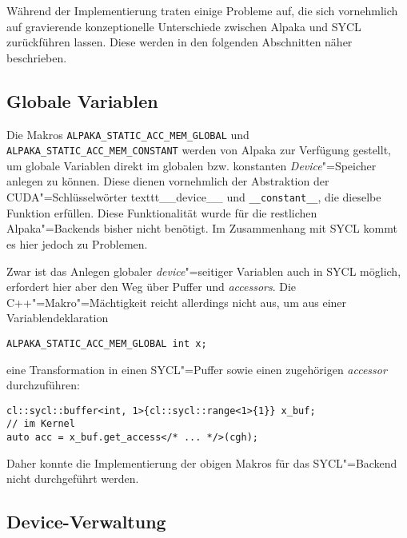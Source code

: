 Während der Implementierung traten einige Probleme auf, die sich vornehmlich
auf gravierende konzeptionelle Unterschiede zwischen Alpaka und SYCL
zurückführen lassen. Diese werden in den folgenden Abschnitten näher
beschrieben.

\subsection{Globale Variablen}\label{implementierung:probleme:globalvar}

Die Makros \texttt{ALPAKA\_STATIC\_ACC\_MEM\_GLOBAL} und
\texttt{ALPAKA\_STATIC\_ACC\_MEM\_CONSTANT} werden von Alpaka zur Verfügung
gestellt, um globale Variablen direkt im globalen bzw. konstanten
\textit{Device}"=Speicher anlegen zu können. Diese dienen vornehmlich der
Abstraktion der CUDA"=Schlüsselwörter texttt{\_\_device\_\_} und
\texttt{\_\_constant\_\_}, die dieselbe Funktion erfüllen. Diese Funktionalität
wurde für die restlichen Alpaka"=Backends bisher nicht benötigt. Im Zusammenhang
mit SYCL kommt es hier jedoch zu Problemen.

Zwar ist das Anlegen globaler \textit{device}"=seitiger Variablen auch in SYCL
möglich, erfordert hier aber den Weg über Puffer und \textit{accessors}. Die
C++"=Makro"=Mächtigkeit reicht allerdings nicht aus, um aus einer
Variablendeklaration

\begin{code}
    \begin{verbatim}
ALPAKA_STATIC_ACC_MEM_GLOBAL int x;
    \end{verbatim}
\end{code}

eine Transformation in einen SYCL"=Puffer sowie einen zugehörigen
\textit{accessor} durchzuführen:

\begin{code}
    \begin{verbatim}
cl::sycl::buffer<int, 1>{cl::sycl::range<1>{1}} x_buf;
// im Kernel
auto acc = x_buf.get_access</* ... */>(cgh);
    \end{verbatim}
\end{code}

Daher konnte die Implementierung der obigen Makros für das SYCL"=Backend nicht
durchgeführt werden.

\subsection{Device-Verwaltung}\label{implementierung:probleme:device}

